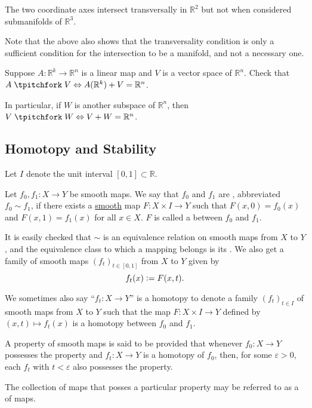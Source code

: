 \begin{ex}
	The two coordinate axes intersect transversally in $\mathbb{R}^{2}$ but not when considered submanifolds of $\mathbb{R}^{3}$. 

	Note that the above also shows that the transversality condition is only a sufficient condition for the intersection to be a manifold, and not a necessary one.
\end{ex}

\begin{exe}
	Suppose $A : \mathbb{R}^{k} \to \mathbb{R}^{n}$ is a linear map and $V$ is a vector space of $\mathbb{R}^{n}$. Check that $A \trans V \Leftrightarrow A(\mathbb{R}^{k}) + V = \mathbb{R}^{n}$. 

	In particular, if $W$ is another subspace of $\mathbb{R}^{n}$, then $V \trans W \Leftrightarrow V + W = \mathbb{R}^{n}$.
\end{exe}

\subsection{Homotopy and Stability}

Let $I$ denote the unit interval $[0, 1] \subset \mathbb{R}$.

\begin{defn}
	Let $f_{0}, f_{1} : X \to Y$ be smooth maps. We say that $f_{0}$ and $f_{1}$ are , abbreviated $f_{0} \sim f_{1}$, if there exists a \underline{smooth} map $F : X \times I \to Y$ such that $F(x, 0) = f_{0}(x)$ and $F(x, 1) = f_{1}(x)$ for all $x \in X$. \newline
	$F$ is called a  between $f_{0}$ and $f_{1}$.
\end{defn}

It is easily checked that $\sim$ is an equivalence relation on smooth maps from $X$ to $Y$, and the equivalence class to which a mapping belongs is its . We also get a family of smooth maps $(f_{t})_{t \in [0, 1]}$ from $X$ to $Y$ given by
\begin{equation*} 
	f_{t}(x) \vcentcolon= F(x, t).
\end{equation*}

We sometimes also say ``$f_{t} : X \to Y$'' is a homotopy to denote a family $(f_{t})_{t \in I}$ of smooth maps from $X$ to $Y$ such that the map $F : X \times I \to Y$ defined by $(x, t) \mapsto f_{t}(x)$ is a homotopy between $f_{0}$ and $f_{1}$.

\begin{defn}
	A property of smooth maps is said to be  provided that whenever $f_{0} : X \to Y$ possesses the property and $f_{t} : X \to Y$ is a homotopy of $f_{0}$, then, for some $\varepsilon > 0$, each $f_{t}$ with $t < \varepsilon$ also possesses the property.

	The collection of maps that posses a particular property may be referred to as a  of maps. 
\end{defn}

